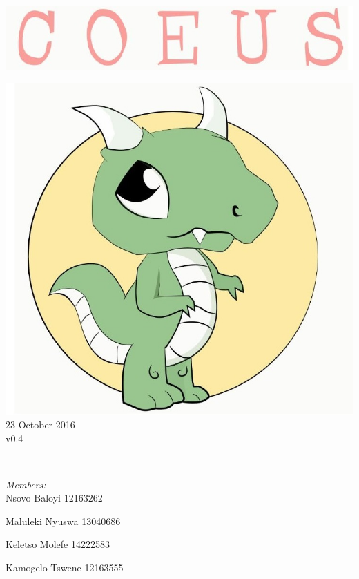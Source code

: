\documentclass[a4paper,12pt]{article}
\begin{document}
\begin{titlepage}
	\includegraphics[width=\textwidth]{name} \\[1cm]
	\begin{minipage}{0.4\textwidth}
	\begin{flushleft} \large
	\includegraphics[width=\textwidth]{logo} \\[0.5cm]
	{\large 23  October 2016}\\
	{\large v0.4}
	\end{flushleft}
	\end{minipage}
	~
	\begin{minipage}{0.5\textwidth}
	\begin{flushright} \large
	\emph{Members:}\\%
	Nsovo Baloyi 12163262

	Maluleki Nyuswa 13040686
	
	Keletso Molefe 14222583
	
	Kamogelo Tswene 12163555

	\end{flushright}
	\end{minipage}\\[4cm]
\end{titlepage}
\end{document}
